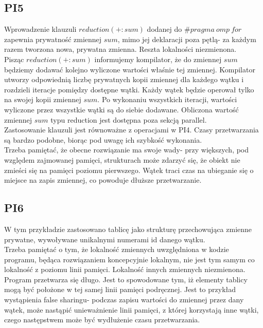 \documentclass{article}
\begin{document}
\subsection{PI5}Wprowadzenie klauzuli $reduction(+:sum)$ dodanej do $\#pragma\:omp\:for$ zapewnia prywatność zmiennej $sum$, mimo jej deklaracji poza pętlą- za każdym razem tworzona nowa, prywatna zmienna. Reszta lokalności niezmienona. \\
Pisząc $reduction(+:sum)$ informujemy kompilator, że do zmiennej $sum$ będziemy dodawać kolejno wyliczone wartości właśnie tej zmiennej. Kompilator utworzy odpowiednią liczbę prywatnych kopii zmiennej dla każdego wątku i rozdzieli iteracje pomiędzy dostępne wątki. Każdy wątek będzie operował tylko na swojej kopii zmiennej $sum$. Po wykonaniu wszystkich iteracji, wartości wyliczone przez wszystkie wątki są do siebie dodawane. Obliczona wartość zmiennej $sum$ typu reduction jest dostępna poza sekcją parallel.\\
Zastosowanie klauzuli jest równoważne z operacjami w PI4. Czasy przetwarzania są bardzo podobne, biorąc pod uwagę ich szybkość wykonania.\\
Trzeba pamiętać, że obecne rozwiązanie ma swoje wady- przy większych, pod względem zajmowanej pamięci, strukturach może zdarzyć się, że obiekt nie zmieści się na pamięci poziomu pierwszego. Wątek traci czas na ubieganie się o miejsce na zapis zmiennej, co powoduje dłuższe przetwarzanie.
\subsection{PI6}
W tym przykładzie zastosowano tablicę jako strukturę przechowująca zmienne prywatne, wywoływane unikalnymi numerami id danego wątku. \\
Trzeba pamiętać o tym, że lokalność zmiennych uwzględniona w kodzie programu, będąca rozwiązaniem koncepcyjnie lokalnym, nie jest tym samym co lokalność z poziomu linii pamięci. Lokalność innych zmiennych niezmienona.\\
Program przetwarza się długo. Jest to spowodowane tym, iż elementy tablicy mogą być położone w tej samej linii pamięci podręcznej. Jest to przykład wystąpienia false sharingu- podczas zapisu wartości do zmiennej przez dany wątek, może nastąpić unieważnienie linii pamięci, z której korzystają inne wątki, czego następstwem może być wydłużenie czasu przetwarzania.
\end{document}
